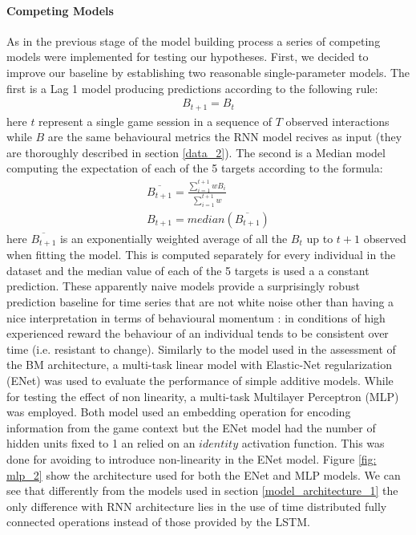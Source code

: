 \paragraph{Competing Models}
\label{competing_models_2}
As in the previous stage of the model building process a series of competing models were implemented for testing our hypotheses. First, we decided to improve our baseline by establishing two reasonable single-parameter models. The first is a Lag 1 model producing predictions according to the following rule:
\begin{equation}
   \begin{gathered}  
     B_{t+1} = B_{t}
     \label{lag_1}
  \end{gathered}
\end{equation}
here $t$ represent a single game session in a sequence of $T$ observed interactions while $B$ are the same behavioural metrics the RNN model recives as input (they are thoroughly described in section \ref{data_2}). The second is a Median model computing the expectation of each of the 5 targets according to the formula:
\begin{equation}
  \begin{gathered}  
    \overline{B_{t+1}} = \frac
      {\sum_{i=1}^{t+1} wB_{i}}
      {\sum_{i=1}^{t+1} w }\\
    B_{t+1} = median(\overline{B_{t+1}}) 
    \label{median}
  \end{gathered}
\end{equation}
here $\overline{B_{t+1}}$ is an exponentially weighted average of all the $B_t$ up to $t+1$ observed when fitting the model. This is computed separately for every individual in the dataset and the median value of each of the 5 targets is used a a constant prediction. These apparently naive models provide a surprisingly robust prediction baseline for time series that are not white noise \cite{hyndman2018forecasting} other than having a nice interpretation in terms of behavioural momentum \cite{nevin2000behavioral}: in conditions of high experienced reward the behaviour of an individual tends to be consistent over time (i.e. resistant to change). Similarly to the model used in the assessment of the BM architecture, a multi-task linear model with Elastic-Net regularization (ENet) \cite{zou2005regularization} was used to evaluate the performance of simple additive models. While for testing the effect of non linearity, a multi-task Multilayer Perceptron (MLP) was employed. Both model used an embedding operation for encoding information from the game context but the ENet model had the number of hidden units fixed to 1 an relied on an $identity$ activation function. This was done for avoiding to introduce non-linearity in the ENet model. Figure \ref{fig: mlp_2} show the architecture used for both the ENet and MLP models. We can see that differently from the models used in section \ref{model_architecture_1} the only difference with RNN architecture lies in the use of time distributed fully connected operations instead of those provided by the LSTM. 


